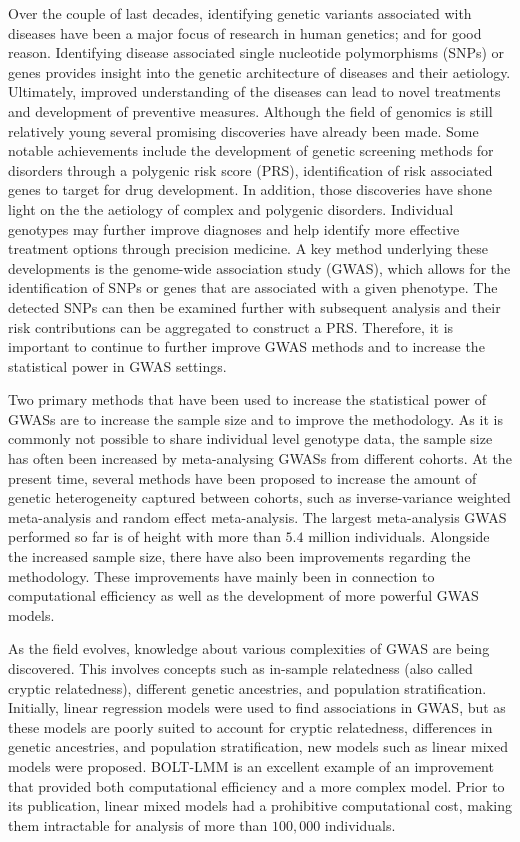 
Over the couple of last decades, identifying genetic variants associated with diseases have been a major focus of research in human genetics; and for good reason. Identifying disease associated single nucleotide polymorphisms (SNPs) or genes provides insight into the genetic architecture of diseases and their aetiology. Ultimately, improved understanding of the diseases can lead to novel treatments and development of preventive measures. Although the field of genomics is still relatively young several promising discoveries have already been made. Some notable achievements include the development of genetic screening methods for disorders through a polygenic risk score (PRS), identification of risk associated genes to target for drug development. In addition, those discoveries have shone light on the the aetiology of complex and polygenic disorders. Individual genotypes may further improve diagnoses and help identify more effective treatment options through precision medicine. A key method underlying these developments is the genome-wide association study (GWAS), which allows for the identification of SNPs or genes that are associated with a given phenotype. The detected SNPs can then be examined further with subsequent analysis and their risk contributions can be aggregated to construct a PRS. Therefore, it is important to continue to further improve GWAS methods and to increase the statistical power in GWAS settings.


Two primary methods that have been used to increase the statistical power of GWASs are to increase the sample size and to improve the methodology. As it is commonly not possible to share individual level genotype data, the sample size has often been increased by meta-analysing GWASs from different cohorts. At the present time, several methods have been proposed to increase the amount of genetic heterogeneity captured between cohorts, such as inverse-variance weighted meta-analysis and random effect meta-analysis\cite{han2011random,willer2010metal}. The largest meta-analysis GWAS performed so far is of height with more than $ 5.4 $ million individuals\cite{yengo2022saturated}. Alongside the increased sample size, there have also been improvements regarding the methodology. These improvements have mainly been in connection to computational efficiency as well as the development of more powerful GWAS models. 

As the field evolves, knowledge about various complexities of GWAS are being discovered. This involves concepts such as in-sample relatedness (also called cryptic relatedness), different genetic ancestries, and population stratification. Initially, linear regression models were used to find associations in GWAS, but as these models are poorly suited to account for cryptic relatedness, differences in genetic ancestries, and population stratification, new models such as linear mixed models were proposed. BOLT-LMM\cite{loh2015efficient} is an excellent example of an improvement that provided both computational efficiency and a more complex model. Prior to its publication, linear mixed models had a prohibitive computational cost, making them intractable for analysis of more than $ 100,000 $ individuals.

